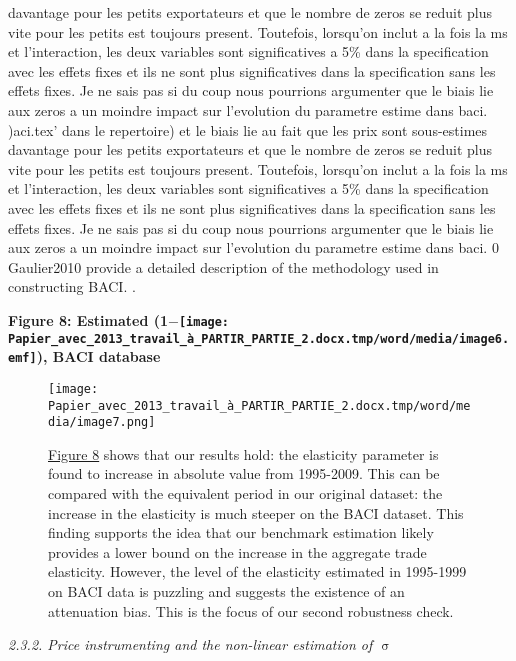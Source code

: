 \documentclass[12pt,twoside,a4paper,notitlepage]{article}
\begin{document}
davantage pour les petits exportateurs et que le nombre de zeros se reduit plus vite pour les petits est toujours present. Toutefois, lorsqu'on inclut a la fois la ms et l'interaction, les deux variables sont significatives a 5\% dans la specification avec les effets fixes et ils ne sont plus significatives dans la specification sans les effets fixes. Je ne sais pas si du coup nous pourrions argumenter que le biais lie aux zeros a un moindre impact sur l'evolution du parametre estime dans baci. )aci.tex' dans le repertoire) et le biais lie au fait que les prix sont sous-estimes davantage pour les petits exportateurs et que le nombre de zeros se reduit plus vite pour les petits est toujours present. Toutefois, lorsqu'on inclut a la fois la ms et l'interaction, les deux variables sont significatives a 5\% dans la specification avec les effets fixes et ils ne sont plus significatives dans la specification sans les effets fixes. Je ne sais pas si du coup nous pourrions argumenter que le biais lie aux zeros a un moindre impact sur l'evolution du parametre estime dans baci. 0 Gaulier2010 provide a detailed description of the methodology used in constructing BACI.
.

\textbf{Figure 8: Estimated (1${-}$\texttt{[image: Papier\_avec\_2013\_travail\_à\_PARTIR\_PARTIE\_2.docx.tmp/word/media/image6.emf]}), BACI database\label{ref-008}}

\begin{figure}
\caption{{\hyperref[ref-008]{Figure 8}} shows that our results hold: the elasticity parameter is found to increase in absolute value from 1995-2009. This can be compared with the equivalent period in our original dataset: the increase in the elasticity is much steeper on the BACI dataset. This finding supports the idea that our benchmark estimation likely provides a lower bound on the increase in the aggregate trade elasticity. However, the level of the elasticity estimated in 1995-1999 on BACI data is puzzling and suggests the existence of an attenuation bias. This is the focus of our second robustness check. }
\texttt{[image: Papier\_avec\_2013\_travail\_à\_PARTIR\_PARTIE\_2.docx.tmp/word/media/image7.png]}
\label{fig:1}
\end{figure}

\textit{2.3.2. Price instrumenting%
 and the non-linear estimation of ${\upsigma}$\label{mark-2.3.2.}}
\end{document}

